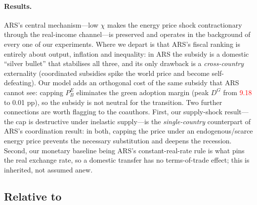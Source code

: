 \documentclass[11pt,a4paper]{article}
\newcommand{\NEEDSRERUN}[1]{\textcolor{red}{#1}}
\begin{document}
\paragraph{Results.} ARS's central mechanism---low $\chi$ makes the energy
price shock contractionary through the real-income channel---is preserved and
operates in the background of every one of our experiments. Where we depart is
that ARS's fiscal ranking is entirely about output, inflation and inequality:
in ARS the subsidy is a domestic ``silver bullet'' that stabilises all three,
and its only drawback is a \emph{cross-country} externality (coordinated
subsidies spike the world price and become self-defeating). Our model adds an
orthogonal cost of the same subsidy that ARS cannot see: capping $P^E_B$
eliminates the green adoption margin (peak $D^G$ from \NEEDSRERUN{9.18} to 0.01 pp), so the
subsidy is not neutral for the transition. Two further connections are worth
flagging to the coauthors. First, our supply-shock result---the cap is
destructive under inelastic supply---is the \emph{single-country} counterpart
of ARS's coordination result: in both, capping the price under an
endogenous/scarce energy price prevents the necessary substitution and deepens
the recession. Second, our monetary baseline being ARS's constant-real-rate
rule is what pins the real exchange rate, so a domestic transfer has no
terms-of-trade effect; this is inherited, not assumed anew.

\subsection{Relative to \citet{Bayer2026}}
\end{document}
